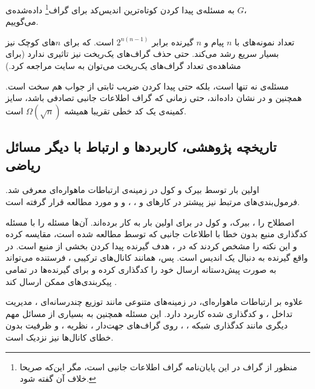 \begin{notation}
	به مسئله‌ی پیدا کردن کوتاه‌ترین اندیس‌کد برای 
 گراف\footnote{منظور از گراف در این پایان‌نامه گراف اطلاعات جانبی است، مگر این‌که صریحا خلاف آن گفته شود.}
	داده‌شده‌ی 
	$G$،
\\ \icodg 
	می‌گوییم.
\end{notation}
		\begin{remark}
		تعداد نمونه‌های \icod با
		$n$
		پیام و 
		$n$
		گیرنده برابر
		$2^{n(n - 1)}$
		است. که برای
		$n$های
		کوچک نیز بسیار سریع رشد می‌کند. حتی حذف گراف‌های یک‌ریخت نیز تاثیری ندارد (برای مشاهده‌ی تعداد گراف‌های یک‌ریخت می‌توان به سایت \cite{web:unlabeled} مراجعه کرد.)
	
     مسئله‌ی
	\icod
نه تنها	
 \nphard  
 است،
 بلکه حتی پیدا کردن ضریب ثابتی از جواب هم سخت است. همچنین
	و
	در
	\cite{6283850}
	نشان داده‌اند، حتی زمانی که گراف اطلاعات جانبی تصادفی باشد، سایز کمینه‌ی یک کد خطی تقریبا همیشه
	$\Omega(\sqrt{n})$
	است.
		\end{remark}


\subsection{تاریخچه پژوهشی، کاربردها و ارتباط با دیگر مسائل ریاضی}
اولین بار
\icod توسط بیرک و کول 
\cite{25, 26}
 در زمینه‌ی ارتباطات ماهواره‌ای معرفی شد. فرمول‌بندی‌های مرتبط نیز پیشتر در کارهای 
 	و 
  \cite{paper:1455117:Celebiler}،
  ،
  و
\cite{152}
و
\cite{158}
 مورد مطالعه قرار گرفته است.
 
 \noindent
  اصطلاح 
   را 
  ، بیرک،
  و کول در
\cite{4031356}
 برای اولین بار به کار برده‌اند. آن‌ها مسئله \icod را با مسئله کدگذاری منبع بدون خطا با اطلاعات جانبی که توسط
\cite{1055607}
 مطالعه شده است، مقایسه کرده و این نکته را مشخص کردند که در \icod، هدف گیرنده پیدا کردن بخشی از منبع است. در واقع گیرنده به دنبال یک اندیس است. پس، همانند کانال‌های ترکیبی
 \cite{27, 53, 154}،
 فرستنده می‌تواند به صورت پیش‌دستانه ارسال خود را کدگذاری کرده و برای گیرنده‌ها در تمامی پیکربندی‌های ممکن ارسال کند
\cite{48}.

 علاوه بر ارتباطات ماهواره‌ای، \icod در زمینه‌های متنوعی مانند توزیع چندرسانه‌ای 
\cite{114}،
مدیریت تداخل 
\cite{81}،
و 
 کدگذاری شده 
\cite{103, 82}
 کاربرد دارد. این مسئله همچنین به بسیاری از مسائل مهم دیگری مانند کدگذاری شبکه 
\cite{122, 61, 59}،
\cite{108, 128, 13}،
 روی گراف‌های جهت‌دار 
\cite{122, 162, 13}،
نظریه
\cite{61}،
و ظرفیت بدون خطای کانال‌ها 
\cite{131}
 نیز نزدیک است.
 
